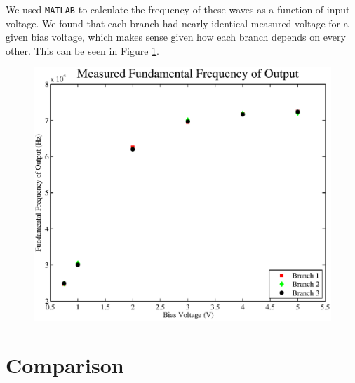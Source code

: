 \documentclass{article}
\begin{document}
We used \texttt{MATLAB} to calculate the frequency of these waves as a function of input voltage.  We found that each branch had nearly identical measured voltage for a given bias voltage, which makes sense given how each branch depends on every other.  This can be seen in Figure \ref{freqs}.

\begin{figure}[H]
\centering
\includegraphics[scale=.5]{freqs.eps}
\caption{}
\label{freqs}
\end{figure}

\section{Comparison}
\end{document}
